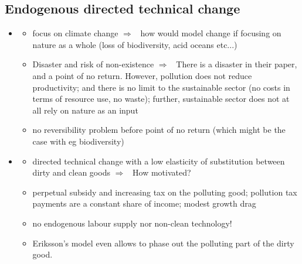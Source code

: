 \documentclass[12pt]{article}
\newcommand{\ar}{$\Rightarrow$ \ }
\begin{document}
\subsection{Endogenous directed technical change}
\begin{itemize}
	\item \cite{Acemoglu2012TheChange}
	\begin{itemize}
		\item focus on climate change \ar how would model change if focusing on nature as a whole (loss of biodiversity, acid oceans etc...)
\item 	Disaster and risk of non-existence \ar There is a disaster in their paper, and a point of no return. However, pollution does not reduce productivity; and there is no limit to the sustainable sector (no costs in terms of resource use, no waste); further, sustainable sector does not at all rely on nature as an input
\item no reversibility problem before point of no return (which might be the case with eg biodiversity)
	\end{itemize}	
	\item \cite{Eriksson2018PhasingChange}
	\begin{itemize}
\item directed technical change with  a low elasticity of substitution between dirty and clean goods \ar How motivated?
\item perpetual subsidy and increasing tax on the polluting good; pollution tax payments are a constant share of income; modest growth drag
\item no endogenous labour supply nor non-clean technology!
\item Eriksson's model even allows to phase out the polluting part of the dirty good. 
	\end{itemize}
\end{itemize} 
\end{document}
